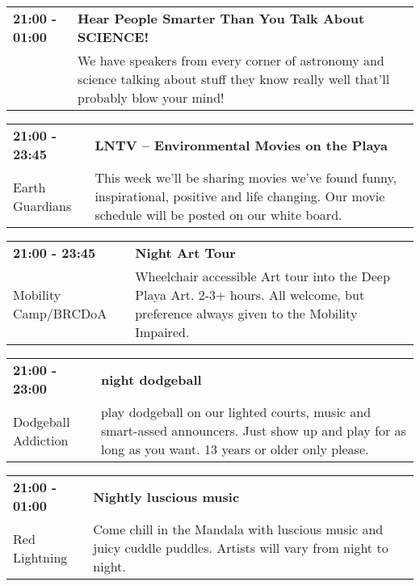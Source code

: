 \begin{tabular}{ p{1in} p{2.2in} }
    \textbf{21:00 - 01:00} & \textbf{Hear People Smarter Than You Talk About SCIENCE! } \\
    ~ \newline  & We have speakers from every corner of astronomy and science talking about stuff they know really well that'll probably blow your mind! \\
    \hline 
\end{tabular}
    
\begin{tabular}{ p{1in} p{2.2in} }
    \textbf{21:00 - 23:45} & \textbf{LNTV -- Environmental Movies on the Playa } \\
    Earth Guardians \newline  & This week we'll be sharing movies we've found funny, inspirational, positive and life changing. Our movie schedule will be posted on our white board. \\
    \hline 
\end{tabular}
    
\begin{tabular}{ p{1in} p{2.2in} }
    \textbf{21:00 - 23:45} & \textbf{Night Art Tour} \\
    Mobility Camp/BRCDoA \newline  & Wheelchair accessible Art tour into the Deep Playa Art.
2-3+ hours. All welcome, but preference always given to the Mobility Impaired. \\
    \hline 
\end{tabular}
    
\begin{tabular}{ p{1in} p{2.2in} }
    \textbf{21:00 - 23:00} & \textbf{night dodgeball} \\
    Dodgeball Addiction \newline  & play dodgeball on our lighted courts, music and smart-assed announcers. Just show up and play for as long as you want. 13 years or older only please. \\
    \hline 
\end{tabular}
    
\begin{tabular}{ p{1in} p{2.2in} }
    \textbf{21:00 - 01:00} & \textbf{Nightly luscious music} \\
    Red Lightning \newline  & Come chill in the Mandala with luscious music and juicy cuddle puddles. Artists will vary from night to night. \\
    \hline 
\end{tabular}
    

